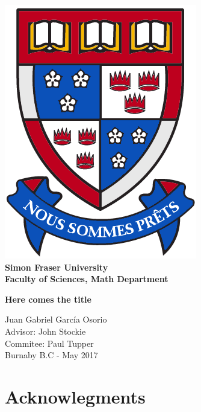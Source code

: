 \documentclass[12pt]{book}
\begin{document}
\setlength{\unitlength}{1 cm} %
\thispagestyle{empty}
\begin{center}
    \includegraphics[scale=0.5]{log.png} \\[1cm]
\textbf{{\LARGE Simon Fraser University}\\[0.5cm]
{\LARGE Faculty of Sciences, Math Department}}\\[1.25cm]
\begin{doublespace}
{\huge \textbf{Here comes the title}}\\[1.5cm]
\end{doublespace}
{\large Juan Gabriel Garc{\'i}a Osorio}\\[1cm]
Advisor: John Stockie\\[1cm]
Commitee: Paul Tupper\\[1cm]
Burnaby B.C - May  2017
\end{center}

\newpage
\tableofcontents


\chapter*{Acknowlegments}
\newpage


\end{document}
